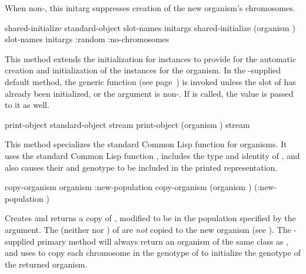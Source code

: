 {\filbreak
{\samepage
{}

When non-, this initarg suppresses creation of the new
organism's chromosomes.
\par}%

\gap

\filbreak
{\samepage


{\samepage
	
\Eggeneric shared-initialize {standard-object slot-names \rest initargs}
 shared-initialize {(organism ) slot-names \rest initargs
	\key :random :no-chromosomes}

This method extends the initialization for  instances to provide for the 
automatic creation and initialization of the  instances for the organism.
In the \geco-supplied default method, the  generic function
(see page~\pageref{method:make-chromosomes}) is invoked unless the  slot of 
 has already been initialized, or the  argument is non-.
If  is called, the  value is passed to it as well.
\par}%

\Eggeneric print-object {standard-object stream}
 print-object {(organism ) stream}

This method specializes the standard Common Lisp  function for
organisms. It uses the standard Common Lisp function ,
includes the type and identity of , and also causes their
 and genotype to be included in the printed
representation.
\par}%

\filbreak

{\samepage
\Defgeneric copy-organism {organism \key :new-population}	\label{copy-organism:organism}
 copy-organism {(organism )
                          \key (:new-population )}

Creates and returns a copy of , modified to be in the
population specified by the  argument. The 
(neither  nor ) of  are {\em
not} copied to the new organism (see ). The
\geco-supplied primary method will always return an organism of the same class as
, and uses  to copy each chromosome in the
genotype of  to initialize the genotype of the returned organism.
\par}%

}
